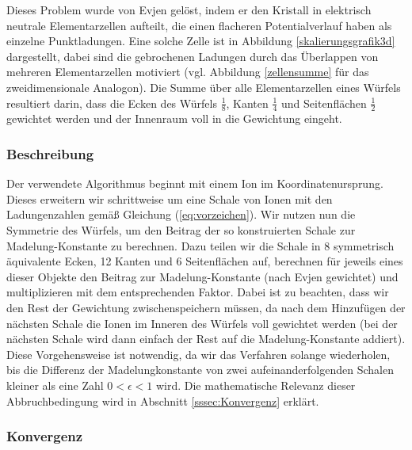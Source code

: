 \documentclass[10pt,a4paper]{article}
\begin{document}
Dieses Problem wurde von Evjen
\cite{Evjen} gelöst, indem er den Kristall in elektrisch neutrale Elementarzellen
aufteilt, die einen flacheren Potentialverlauf haben als einzelne Punktladungen.
Eine solche Zelle ist in Abbildung \ref{skalierungsgrafik3d} dargestellt,
dabei sind die gebrochenen Ladungen durch das Überlappen von mehreren Elementarzellen
motiviert (vgl. Abbildung \ref{zellensumme} für das zweidimensionale Analogon). Die Summe über 
alle Elementarzellen eines Würfels resultiert darin, dass die Ecken des Würfels
$\frac{1}{8}$, Kanten $\frac{1}{4}$ und Seitenflächen $\frac{1}{2}$ gewichtet werden
und der Innenraum voll in die Gewichtung eingeht.

\subsubsection{Beschreibung}

Der verwendete Algorithmus beginnt mit einem Ion im Koordinatenursprung. Dieses
erweitern wir schrittweise um eine Schale von Ionen mit den Ladungenzahlen gemäß
Gleichung (\ref{eq:vorzeichen}). Wir nutzen nun die Symmetrie des Würfels, um den Beitrag
der so konstruierten Schale zur Madelung-Konstante zu berechnen. Dazu teilen wir die
Schale in 8 symmetrisch äquivalente Ecken, 12 Kanten und 6 Seitenflächen auf, berechnen für
jeweils eines dieser Objekte den Beitrag zur Madelung-Konstante (nach Evjen gewichtet)
und multiplizieren mit dem entsprechenden Faktor. Dabei ist zu beachten, dass wir
den Rest der Gewichtung zwischenspeichern müssen, da nach dem Hinzufügen der nächsten
Schale die Ionen im Inneren des Würfels voll gewichtet werden (bei der nächsten Schale
wird dann einfach der Rest auf die Madelung-Konstante addiert). Diese Vorgehensweise ist notwendig, da wir das Verfahren solange wiederholen, bis die Differenz der Madelungkonstante
von zwei aufeinanderfolgenden Schalen kleiner als eine Zahl $0 < \epsilon < 1$ wird. Die
mathematische Relevanz dieser Abbruchbedingung wird in Abschnitt \ref{sssec:Konvergenz}
erklärt.

\subsubsection{Konvergenz}
\end{document}
